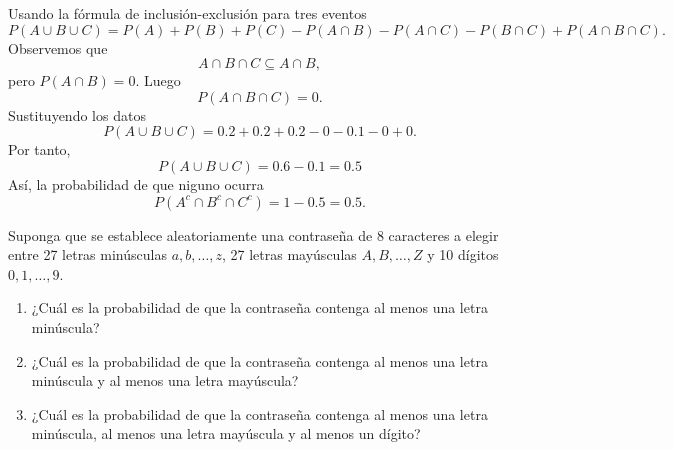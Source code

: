 \documentclass[12pt,a4paper]{article}
\begin{document}
     \begin{solucion}
        Usando la fórmula de inclusión-exclusión para tres eventos
        \begin{equation*}
            P(A\cup B\cup C)=P(A)+P(B)+P(C)-P(A\cap B)-P(A\cap C)-P(B\cap C)+P(A\cap B\cap C).
        \end{equation*}
        Observemos que
        \begin{equation*}
            A\cap B\cap C\subseteq A\cap B,
        \end{equation*}
        pero $P(A\cap B)=0$. Luego
        \begin{equation*}
            P(A\cap B\cap C)=0.
        \end{equation*}
        Sustituyendo los datos
        \begin{equation*}
            P(A\cup B\cup C)=0.2+0.2+0.2-0-0.1-0+0.
        \end{equation*}
        Por tanto,
        \begin{equation*}
            P(A\cup B\cup C)=0.6-0.1=0.5
        \end{equation*}
        Así, la probabilidad de que niguno ocurra
        \begin{equation*}
            P(A^{c}\cap B^{c}\cap C^{c})=1-0.5=0.5.
        \end{equation*}
     \end{solucion}

    \begin{mdframed}[style=mdbluebox,frametitle={Ejercicio 7}]
        Suponga que se establece aleatoriamente una contraseña de 8 caracteres a elegir entre 27 letras minúsculas $a, b, \dots, z$, 27 letras mayúsculas $A, B, \dots, Z$ y 10 dígitos $0,1,\dots,9$.
        \begin{enumerate}
            \item[(a)] ¿Cuál es la probabilidad de que la contraseña contenga al menos una letra minúscula?
            \item[(b)] ¿Cuál es la probabilidad de que la contraseña contenga al menos una letra minúscula y al menos una letra mayúscula?
            \item[(c)] ¿Cuál es la probabilidad de que la contraseña contenga al menos una letra minúscula, al menos una letra mayúscula y al menos un dígito?
        \end{enumerate}
    \end{mdframed}
\end{document}

